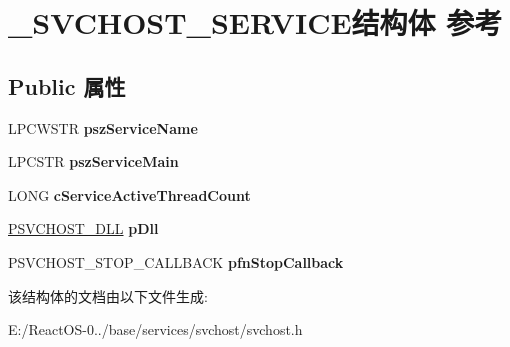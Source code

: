 \hypertarget{struct___s_v_c_h_o_s_t___s_e_r_v_i_c_e}{}\section{\+\_\+\+S\+V\+C\+H\+O\+S\+T\+\_\+\+S\+E\+R\+V\+I\+C\+E结构体 参考}
\label{struct___s_v_c_h_o_s_t___s_e_r_v_i_c_e}
\subsection*{Public 属性}
\begin{DoxyCompactItemize}
\item 
\mbox{\label{struct___s_v_c_h_o_s_t___s_e_r_v_i_c_e_a61413c487afe9786609aae9302ffa3ca}} 
L\+P\+C\+W\+S\+TR {\bfseries psz\+Service\+Name}
\item 
\mbox{\label{struct___s_v_c_h_o_s_t___s_e_r_v_i_c_e_aa598fb4fc02d9ca3b5d66ebfceb43202}} 
L\+P\+C\+S\+TR {\bfseries psz\+Service\+Main}
\item 
\mbox{\label{struct___s_v_c_h_o_s_t___s_e_r_v_i_c_e_a4a8328271f6deb14764ef18725d2b047}} 
L\+O\+NG {\bfseries c\+Service\+Active\+Thread\+Count}
\item 
\mbox{\label{struct___s_v_c_h_o_s_t___s_e_r_v_i_c_e_a6f93a8f793eeab0879f6d9a667d046d5}} 
\hyperlink{struct___s_v_c_h_o_s_t___d_l_l}{P\+S\+V\+C\+H\+O\+S\+T\+\_\+\+D\+LL} {\bfseries p\+Dll}
\item 
\mbox{\label{struct___s_v_c_h_o_s_t___s_e_r_v_i_c_e_a638ccd1d685670937c64d418d6da4c42}} 
P\+S\+V\+C\+H\+O\+S\+T\+\_\+\+S\+T\+O\+P\+\_\+\+C\+A\+L\+L\+B\+A\+CK {\bfseries pfn\+Stop\+Callback}
\end{DoxyCompactItemize}


该结构体的文档由以下文件生成\+:\begin{DoxyCompactItemize}
\item 
E\+:/\+React\+O\+S-\/0../base/services/svchost/svchost.\+h\end{DoxyCompactItemize}
